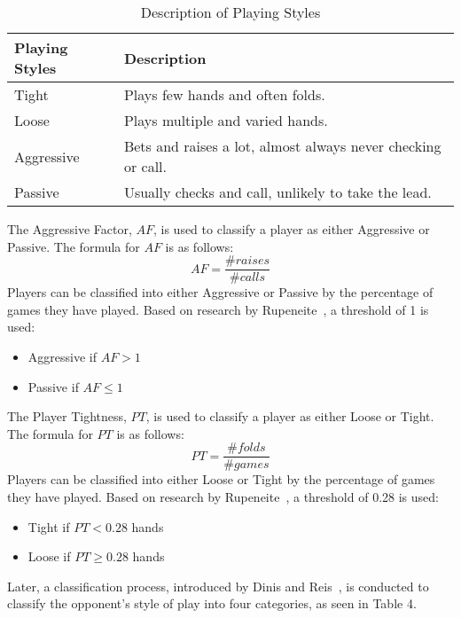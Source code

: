 \documentclass{article}
\begin{document}
\begin{table}[h!]
  \begin{center}
    \begin{tabular}{|l|p{5cm}|}
    \hline
      \textbf{Playing Styles} & \textbf{Description} \\
      \hline
      Tight & Plays few hands and often folds. \\
      \hline
      Loose & Plays multiple and varied hands.  \\
      \hline
      Aggressive &  Bets and raises a lot, almost always never checking or call. \\
      \hline
      Passive & Usually checks and call, unlikely to take the lead. \\
      \hline
    \end{tabular}
    \caption{Description of Playing Styles}
    \label{tab:table3}
  \end{center}
\end{table}
The Aggressive Factor, $AF$, is used to classify a player as either Aggressive or Passive. The formula for $AF$ is as follows:
\begin{displaymath}
  AF = \frac{\text{\# }raises}{\text{\# }calls}
\end{displaymath}
\noindent Players can be classified into either Aggressive or Passive by the percentage of games they have played. Based on research by Rupeneite~, a threshold of 1 is used:
\begin{itemize}
	\item Aggressive if $AF > 1$
	\item Passive if $AF \leq 1$
\end{itemize}

The Player Tightness, $PT$, is used to classify a player as either Loose or Tight. The formula for $PT$ is as follows:
\begin{displaymath}
  PT =  \frac{\text{\# }folds}{\text{\# }games} 
\end{displaymath}
\noindent Players can be classified into either Loose or Tight by the percentage of games they have played. Based on research by Rupeneite~, a threshold of 0.28 is used:
\begin{itemize}
	\item Tight if $PT < 0.28$ hands
	\item Loose if $PT \geq 0.28$ hands
\end{itemize}

Later, a classification process, introduced by Dinis and Reis~, is conducted to classify the opponent's style of play into four categories, as seen in Table 4.
\end{document}
